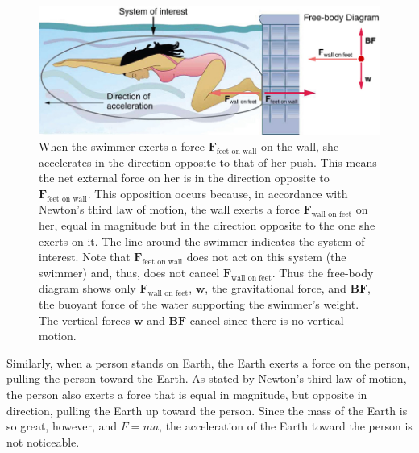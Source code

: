 \documentclass[
]{book}
\begin{document}
\begin{figure}
\hypertarget{import-auto-id2338100}{%
\centering
\includegraphics{images/Figure_04_04_01.jpg}
\caption{When the swimmer exerts a force \(\textbf{F}_{\text{feet\ on\ wall}}{}\)
on the wall, she accelerates in the direction opposite to that of her
push. This means the net external force on her is in the direction
opposite to \(\textbf{F}_{\text{feet\ on\ wall}}{}\). This opposition
occurs because, in accordance with Newton's third law of motion, the
wall exerts a force \(\textbf{F}_{\text{wall\ on\ feet}}{}\) on her, equal
in magnitude but in the direction opposite to the one she exerts on it.
The line around the swimmer indicates the system of interest. Note that
\(\textbf{F}_{\text{feet\ on\ wall}}{}\) does not act on this system (the
swimmer) and, thus, does not cancel
\(\textbf{F}_{\text{wall\ on\ feet}}{}\). Thus the free-body diagram shows
only \(\textbf{F}_{\text{wall\ on\ feet}}{}\), \(\textbf{w}{}\), the
gravitational force, and \(\textbf{BF}{}\), the buoyant force of the water
supporting the swimmer's weight. The vertical forces \(\textbf{w}{}\) and
\(\textbf{BF}{}\) cancel since there is no vertical
motion.}\label{import-auto-id2338100}
}
\end{figure}

Similarly, when a person stands on Earth, the Earth exerts a force on
the person, pulling the person toward the Earth. As stated by Newton's
third law of motion, the person also exerts a force that is equal in
magnitude, but opposite in direction, pulling the Earth up toward the
person. Since the mass of the Earth is so great, however, and \(F = ma\),
the acceleration of the Earth toward the person is not noticeable.
\end{document}
